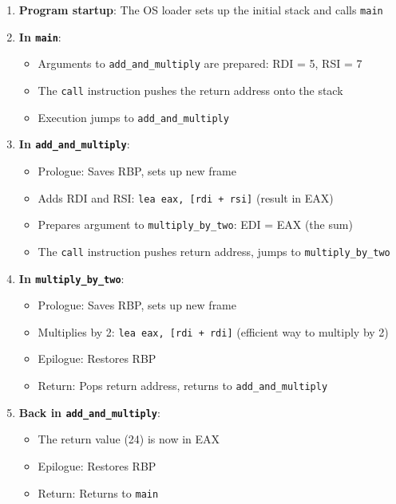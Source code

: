 \begin{enumerate}
  \item \textbf{Program startup}: The OS loader sets up the initial stack and calls \texttt{main}

  \item \textbf{In \texttt{main}}:
    \begin{itemize}
      \item Arguments to \texttt{add\_and\_multiply} are prepared: RDI = 5, RSI = 7
      \item The \texttt{call} instruction pushes the return address onto the stack
      \item Execution jumps to \texttt{add\_and\_multiply}
    \end{itemize}

  \item \textbf{In \texttt{add\_and\_multiply}}:
    \begin{itemize}
      \item Prologue: Saves RBP, sets up new frame
      \item Adds RDI and RSI: \texttt{lea eax, [rdi + rsi]} (result in EAX)
      \item Prepares argument to \texttt{multiply\_by\_two}: EDI = EAX (the sum)
      \item The \texttt{call} instruction pushes return address, jumps to \texttt{multiply\_by\_two}
    \end{itemize}

  \item \textbf{In \texttt{multiply\_by\_two}}:
    \begin{itemize}
      \item Prologue: Saves RBP, sets up new frame
      \item Multiplies by 2: \texttt{lea eax, [rdi + rdi]} (efficient way to multiply by 2)
      \item Epilogue: Restores RBP
      \item Return: Pops return address, returns to \texttt{add\_and\_multiply}
    \end{itemize}

  \item \textbf{Back in \texttt{add\_and\_multiply}}:
    \begin{itemize}
      \item The return value (24) is now in EAX
      \item Epilogue: Restores RBP
      \item Return: Returns to \texttt{main}
    \end{itemize}


\end{enumerate}
